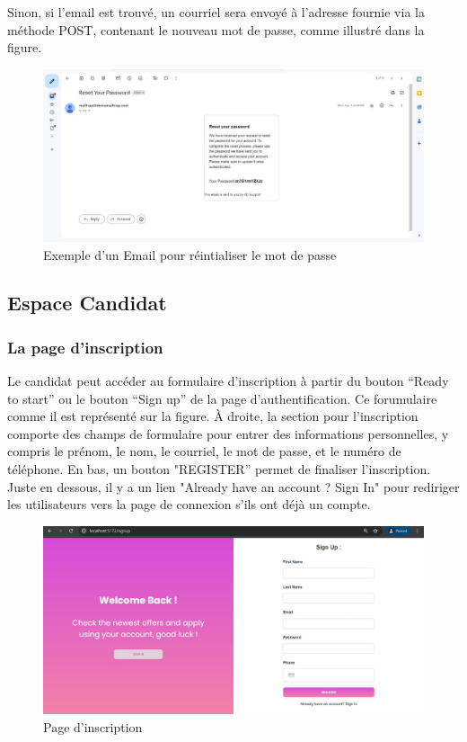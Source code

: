Sinon, si  l'email est  trouvé, un  courriel sera envoyé à l'adresse fournie via la méthode POST, contenant le  nouveau mot de  passe, comme illustré dans la figure.
\begin{figure}[htbp]
   \centering
   \includegraphics[scale=0.5]{screens/mailPssword.jpg} 
   \caption{Exemple d'un Email pour réintialiser le mot de passe}
   \label{fig:mailPass}
\end{figure}

\subsection{Espace Candidat}
\subsubsection{La page d’inscription}
Le candidat peut accéder au formulaire d’inscription à partir du bouton “Ready to start” ou le bouton “Sign up” de la page d’authentification. Ce forumulaire comme il est représenté sur la figure. À droite, la section pour l'inscription comporte des champs de formulaire pour entrer des informations personnelles, y compris le prénom, le nom, le courriel, le mot de  passe, et  le numéro de téléphone. En bas, un bouton "REGISTER” permet de finaliser l'inscription. Juste en dessous, il y a un lien "Already have an account ? Sign In" pour rediriger les utilisateurs vers la page de connexion s’ils ont déjà un compte.

\begin{figure}[htbp]
   \centering
   \includegraphics[scale=0.5]{screens/signup.jpg} 
   \caption{Page d'inscription}
   \label{fig:singup}
\end{figure}

